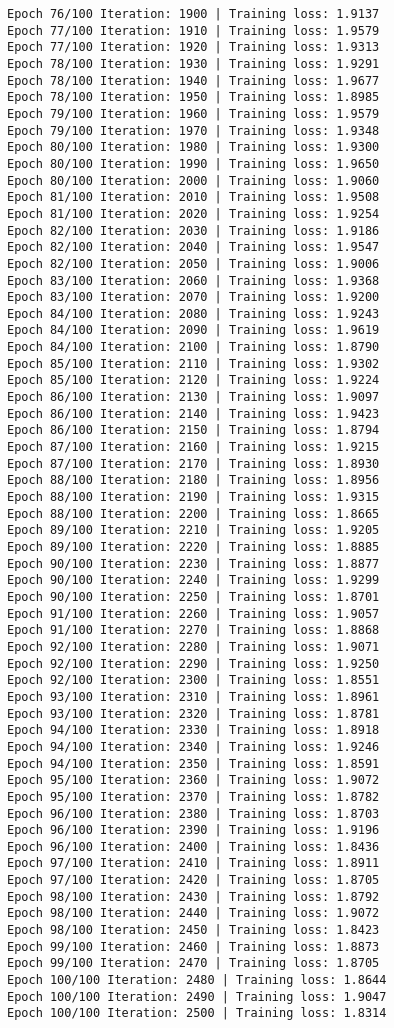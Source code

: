 \documentclass[11pt]{article}
\begin{document}
\begin{Verbatim}[commandchars=\\\{\}]
Epoch 76/100 Iteration: 1900 | Training loss: 1.9137
Epoch 77/100 Iteration: 1910 | Training loss: 1.9579
Epoch 77/100 Iteration: 1920 | Training loss: 1.9313
Epoch 78/100 Iteration: 1930 | Training loss: 1.9291
Epoch 78/100 Iteration: 1940 | Training loss: 1.9677
Epoch 78/100 Iteration: 1950 | Training loss: 1.8985
Epoch 79/100 Iteration: 1960 | Training loss: 1.9579
Epoch 79/100 Iteration: 1970 | Training loss: 1.9348
Epoch 80/100 Iteration: 1980 | Training loss: 1.9300
Epoch 80/100 Iteration: 1990 | Training loss: 1.9650
Epoch 80/100 Iteration: 2000 | Training loss: 1.9060
Epoch 81/100 Iteration: 2010 | Training loss: 1.9508
Epoch 81/100 Iteration: 2020 | Training loss: 1.9254
Epoch 82/100 Iteration: 2030 | Training loss: 1.9186
Epoch 82/100 Iteration: 2040 | Training loss: 1.9547
Epoch 82/100 Iteration: 2050 | Training loss: 1.9006
Epoch 83/100 Iteration: 2060 | Training loss: 1.9368
Epoch 83/100 Iteration: 2070 | Training loss: 1.9200
Epoch 84/100 Iteration: 2080 | Training loss: 1.9243
Epoch 84/100 Iteration: 2090 | Training loss: 1.9619
Epoch 84/100 Iteration: 2100 | Training loss: 1.8790
Epoch 85/100 Iteration: 2110 | Training loss: 1.9302
Epoch 85/100 Iteration: 2120 | Training loss: 1.9224
Epoch 86/100 Iteration: 2130 | Training loss: 1.9097
Epoch 86/100 Iteration: 2140 | Training loss: 1.9423
Epoch 86/100 Iteration: 2150 | Training loss: 1.8794
Epoch 87/100 Iteration: 2160 | Training loss: 1.9215
Epoch 87/100 Iteration: 2170 | Training loss: 1.8930
Epoch 88/100 Iteration: 2180 | Training loss: 1.8956
Epoch 88/100 Iteration: 2190 | Training loss: 1.9315
Epoch 88/100 Iteration: 2200 | Training loss: 1.8665
Epoch 89/100 Iteration: 2210 | Training loss: 1.9205
Epoch 89/100 Iteration: 2220 | Training loss: 1.8885
Epoch 90/100 Iteration: 2230 | Training loss: 1.8877
Epoch 90/100 Iteration: 2240 | Training loss: 1.9299
Epoch 90/100 Iteration: 2250 | Training loss: 1.8701
Epoch 91/100 Iteration: 2260 | Training loss: 1.9057
Epoch 91/100 Iteration: 2270 | Training loss: 1.8868
Epoch 92/100 Iteration: 2280 | Training loss: 1.9071
Epoch 92/100 Iteration: 2290 | Training loss: 1.9250
Epoch 92/100 Iteration: 2300 | Training loss: 1.8551
Epoch 93/100 Iteration: 2310 | Training loss: 1.8961
Epoch 93/100 Iteration: 2320 | Training loss: 1.8781
Epoch 94/100 Iteration: 2330 | Training loss: 1.8918
Epoch 94/100 Iteration: 2340 | Training loss: 1.9246
Epoch 94/100 Iteration: 2350 | Training loss: 1.8591
Epoch 95/100 Iteration: 2360 | Training loss: 1.9072
Epoch 95/100 Iteration: 2370 | Training loss: 1.8782
Epoch 96/100 Iteration: 2380 | Training loss: 1.8703
Epoch 96/100 Iteration: 2390 | Training loss: 1.9196
Epoch 96/100 Iteration: 2400 | Training loss: 1.8436
Epoch 97/100 Iteration: 2410 | Training loss: 1.8911
Epoch 97/100 Iteration: 2420 | Training loss: 1.8705
Epoch 98/100 Iteration: 2430 | Training loss: 1.8792
Epoch 98/100 Iteration: 2440 | Training loss: 1.9072
Epoch 98/100 Iteration: 2450 | Training loss: 1.8423
Epoch 99/100 Iteration: 2460 | Training loss: 1.8873
Epoch 99/100 Iteration: 2470 | Training loss: 1.8705
Epoch 100/100 Iteration: 2480 | Training loss: 1.8644
Epoch 100/100 Iteration: 2490 | Training loss: 1.9047
Epoch 100/100 Iteration: 2500 | Training loss: 1.8314


\end{Verbatim}
\end{document}
